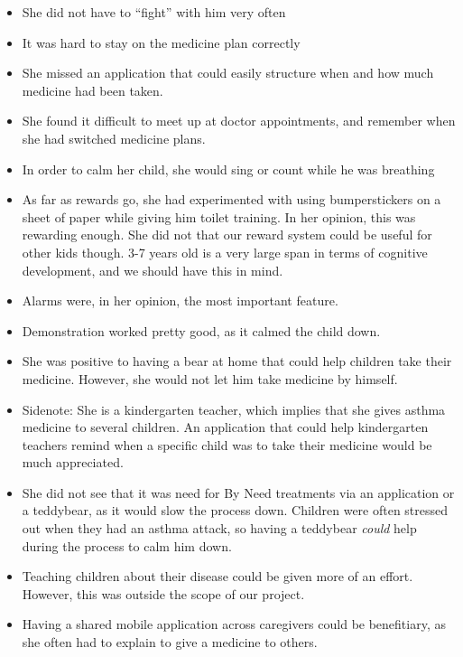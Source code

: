 \begin{itemize}
  \item She did not have to ``fight'' with him very often
  \item It was hard to stay on the medicine plan correctly
  \item She missed an application that could easily structure when and how much medicine had been taken.
  \item She found it difficult to meet up at doctor appointments, and remember when she had switched medicine plans. 
  \item In order to calm her child, she would sing or count while he was breathing
  \item As far as rewards go, she had experimented with using bumperstickers on a sheet of paper while giving him toilet training. In her opinion, this was rewarding enough. She did not that our reward system could be useful for other kids though. 3-7 years old is a very large span in terms of cognitive development, and we should have this in mind. 
  \item Alarms were, in her opinion, the most important feature. 
  \item Demonstration worked pretty good, as it calmed the child down. 
  \item She was positive to having a bear at home that could help children take their medicine. However, she would not let him take medicine by himself. 
  \item Sidenote: She is a kindergarten teacher, which implies that she gives asthma medicine to several children. An application that could help kindergarten teachers remind when a specific child was to take their medicine would be much appreciated.
  \item She did not see that it was need for By Need treatments via an application or a teddybear, as it would slow the process down. Children were often stressed out when they had an asthma attack, so having a teddybear \emph{could} help during the process to calm him down. 
  \item Teaching children about their disease could be given more of an effort. However, this was outside the scope of our project. 
  \item Having a shared mobile application across caregivers could be benefitiary, as she often had to explain to give a medicine to others.  
\end{itemize} 